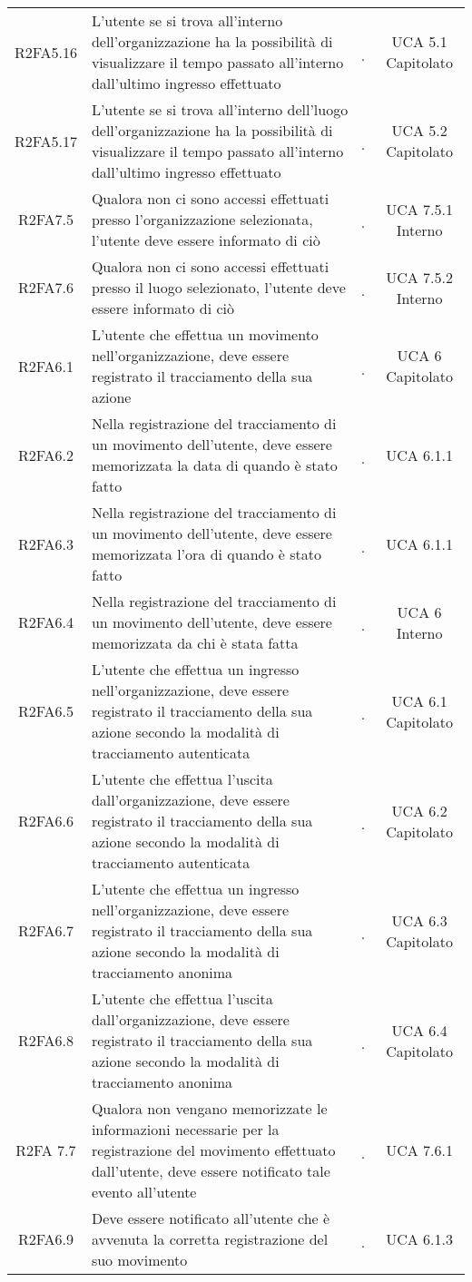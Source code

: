 {\begin{longtable}{ c C{4cm} c c}
R2FA5.16 & L’utente se si trova all’interno dell’organizzazione ha la possibilità di visualizzare il tempo passato all’interno dall'ultimo ingresso effettuato & \d & UCA 5.1 Capitolato \\
R2FA5.17 & L’utente se si trova all’interno dell’luogo dell’organizzazione ha la possibilità di visualizzare il tempo passato all’interno dall'ultimo ingresso effettuato & \d & UCA 5.2 Capitolato \\
R2FA7.5 & Qualora non ci sono accessi effettuati presso l'organizzazione selezionata, l'utente deve essere informato di ciò & \d & UCA 7.5.1 Interno \\
R2FA7.6 & Qualora non ci sono accessi effettuati presso il luogo selezionato, l'utente deve essere informato di ciò & \d & UCA 7.5.2 Interno \\
R2FA6.1 & L’utente che effettua un movimento nell’organizzazione, deve essere registrato il tracciamento della sua azione & \d & UCA 6 Capitolato \\
R2FA6.2 & Nella registrazione del tracciamento di un movimento dell’utente, deve essere memorizzata la data di quando è stato fatto & \d & UCA 6.1.1 \\
R2FA6.3 & Nella registrazione del tracciamento di un movimento dell’utente, deve essere memorizzata l’ora di quando è stato fatto & \d & UCA 6.1.1 \\
R2FA6.4 & Nella registrazione del tracciamento di un movimento dell’utente, deve essere memorizzata da chi è stata fatta & \d & UCA 6 Interno \\
R2FA6.5 & L’utente che effettua un ingresso nell’organizzazione, deve essere registrato il tracciamento della sua azione secondo la modalità di tracciamento autenticata & \d & UCA 6.1 Capitolato \\
R2FA6.6 & L’utente che effettua l’uscita dall’organizzazione, deve essere registrato il tracciamento della sua azione secondo la modalità di tracciamento autenticata & \d & UCA 6.2 Capitolato \\
R2FA6.7 & L’utente che effettua un ingresso nell’organizzazione, deve essere registrato il tracciamento della sua azione secondo la modalità di tracciamento anonima & \d & UCA 6.3 Capitolato \\
R2FA6.8 & L’utente che effettua l’uscita dall’organizzazione, deve essere registrato il tracciamento della sua azione secondo la modalità di tracciamento anonima & \d & UCA 6.4 Capitolato \\
R2FA 7.7 & Qualora non vengano memorizzate le informazioni necessarie per la registrazione del movimento effettuato dall’utente, deve essere notificato tale evento all’utente & \d & UCA 7.6.1 \\
R2FA6.9 & Deve essere notificato all’utente che è avvenuta la corretta registrazione del suo movimento & \d & UCA 6.1.3 \\


\end{longtable}}
